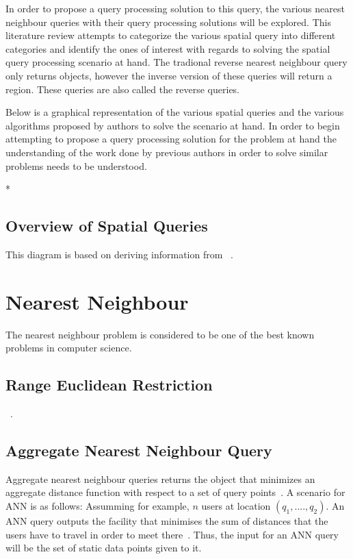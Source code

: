 \documentclass[a4paper,11pt]{article}
\begin{document}
In order to propose a query processing solution to this query, the various
nearest neighbour queries with their query processing solutions will be
explored. This literature review attempts to categorize the various spatial
query into different categories and identify the ones of interest with regards
to solving the spatial query processing scenario at hand. The tradional
reverse nearest neighbour query only returns objects, however the inverse
version of these queries will return a region. These queries are also called
the reverse queries.

Below is a graphical representation of the various spatial queries and the
various algorithms proposed by authors to solve the scenario at hand. In order
to begin attempting to propose a query processing solution for the problem at
hand the understanding of the work done by previous authors in order to solve
similar problems needs to be understood.

\/*
\subsection{Overview of Spatial Queries}

This diagram is based on deriving information from ~\cite{taniar2013taxonomy}.

\section{Nearest Neighbour}

The nearest neighbour problem is considered to be one of the best known
problems in computer science.

\subsection{Range Euclidean Restriction}

~\cite{papadias2003query}. 

\subsection{Aggregate Nearest Neighbour Query}

Aggregate nearest neighbour queries returns the object that minimizes an
aggregate distance function with respect to a set of query
points~\cite{yiu2005aggregate}. A scenario for ANN is as follows: Assumming
for example, $n$ users at location $(q_1,....,q_2)$. An ANN query outputs the
facility that minimises the sum of distances that the users have to travel in
order to meet there~\cite{papadias2005aggregate}. Thus, the input for an ANN
query will be the set of static data points given to it.
\end{document}

